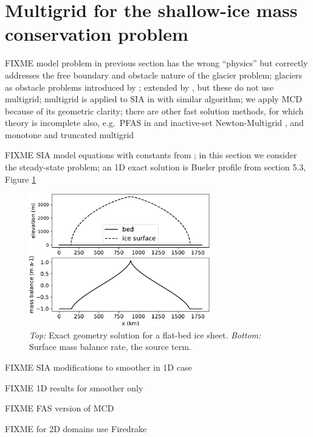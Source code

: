 \documentclass[letterpaper,final,12pt,reqno]{amsart}
\theoremstyle{claim}
\numberwithin{equation}{section}
\numberwithin{figure}{section}
\numberwithin{table}{section}
\numberwithin{theorem}{section}
\begin{document}
\section{Multigrid for the shallow-ice mass conservation problem} \label{sec:sia}

FIXME model problem in previous section has the wrong ``physics'' but correctly addresses the free boundary and obstacle nature of the glacier problem; glaciers as obstacle problems introduced by \cite{Calvoetal2002}; extended by \cite{Bueler2016,Bueler2020,JouvetBueler2012}, but these do not use multigrid; multigrid is applied to SIA in \cite{Jouvetetal2013,JouvetGraeser2013} with similar algorithm; we apply MCD because of its geometric clarity; there are other fast solution methods, for which theory is incomplete also, e.g.~PFAS in \cite{BrandtCryer1983} and inactive-set Newton-Multigrid \cite[Chapter 12]{Bueler2021}, and monotone and truncated multigrid \cite{GraeserKornhuber2009}

FIXME SIA model equations \cite{Bueler2016} with constants from \cite{Huybrechtsetal1996}; in this section we consider the steady-state problem; an 1D exact solution is Bueler profile from \cite{vanderVeen2013} section 5.3, Figure \ref{fig:siadatafigure}

\begin{figure}
\includegraphics[width=0.7\textwidth]{fixfigs/siadatafigure.pdf}
\caption{\emph{Top:} Exact geometry solution for a flat-bed ice sheet.  \emph{Bottom:} Surface mass balance rate, the source term.}
\label{fig:siadatafigure}
\end{figure}

FIXME SIA modifications to smoother in 1D case

FIXME 1D results for smoother only

FIXME FAS version of MCD

FIXME for 2D domains use Firedrake
\end{document}
